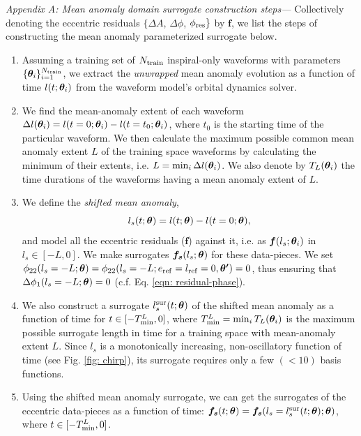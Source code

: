 \textit{Appendix A: Mean anomaly domain surrogate construction steps---}
Collectively denoting the eccentric residuals $\{\Delta A$, $\Delta \phi$, $\phi_{\rm{res}}\}$ by $\bm{f}$, we list the steps of constructing the mean anomaly parameterized surrogate below. 
\begin{enumerate}
    \item Assuming a training set of $N_{\rm{train}}$ inspiral-only waveforms with parameters $\{\bm{\theta}_i\}_{i=1}^{N_{\rm{train}}}$, we extract the \textit{unwrapped} mean anomaly evolution as a function of time $l(t; \bm{\theta}_i)$ from the waveform model's orbital dynamics solver.
    \item We find the mean-anomaly extent of each waveform $\Delta l(\bm{\theta}_i) = l(t=0; \bm{\theta}_i) - l(t=t_0; \bm{\theta}_i)$, where $t_0$ is the starting time of the particular waveform. We then calculate the maximum possible common mean anomaly extent $L$ of the training space waveforms by calculating the minimum of their extents, i.e. $L = \mathrm{min}_i\, \Delta l(\bm{\theta}_i)$. We also denote by $T_L(\bm{\theta}_i)$ the time durations of the waveforms having a mean anomaly extent of $L$. 
    \item We define the \textit{shifted mean anomaly}, 
    \begin{equation}
        l_s(t; \bm{\theta}) = l(t; \bm{\theta}) - l(t=0; \bm{\theta}),
        \label{eqn: shifted mean anomaly}
    \end{equation}
    and model all the eccentric residuals ($\bm{f}$) against it, i.e. as $\bm{f}(l_s; \bm{\theta}_i)$ in $l_s \in [-L, 0]$. We make surrogates $\bm{f_s}(l_s; \bm{\theta})$ for these data-pieces.
    We set $\phi_{22}(l_s=-L; \bm{\theta})=\phi_{22}(l_s=-L; e_{\rm{ref}}=l_{\rm{ref}}=0, \bm{\theta'})=0$, thus ensuring that $\Delta \phi_1(l_s=-L; \bm{\theta})=0$ (c.f. Eq. \ref{eqn: residual-phase}).
    \item We also construct a surrogate $l_s^{\rm{sur}}(t; \bm{\theta})$ of the shifted mean anomaly as a function of time for $t \in [-T_{\rm{min}}^L, 0]$, where $T_{\rm{min}}^L = \mathrm{min}_i \, T_L(\bm{\theta}_i)$ is the maximum possible surrogate length in time for a training space with mean-anomaly extent $L$. Since $l_s$ is a monotonically increasing, non-oscillatory function of time (see Fig. \ref{fig: chirp}), its surrogate requires only a few $(<10)$ basis functions.
    \item Using the shifted mean anomaly surrogate, we can get the surrogates of the eccentric data-pieces as a function of time: $\bm{f_s}(t; \bm{\theta}) = \bm{f_s}(l_s=l_s^{\rm{sur}}(t; \bm{\theta}); \bm{\theta})$, where $t \in [-T_{\rm{min}}^L, 0]$.

\end{enumerate}
